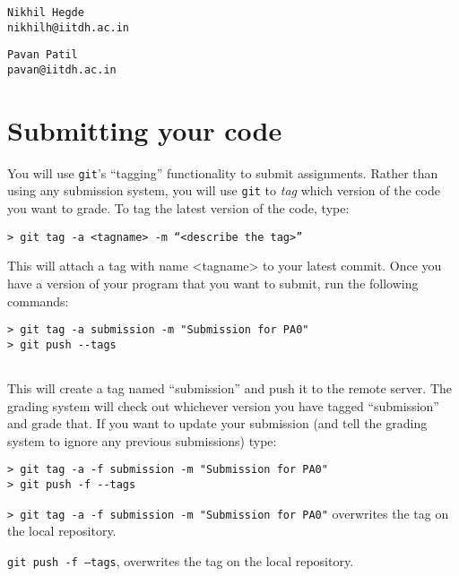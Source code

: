 \documentclass{article}
\begin{document}
\begin{lstlisting}[numbers=none]
Nikhil Hegde
nikhilh@iitdh.ac.in
\end{lstlisting}

\begin{lstlisting}[numbers=none]
Pavan Patil
pavan@iitdh.ac.in
\end{lstlisting}


\section{Submitting your code}
You will use \texttt{git}'s ``tagging'' functionality to submit assignments. Rather than using any submission system, you will use \texttt{git} to \emph{tag} which version of the code you want to grade. To tag the latest version of the code, type:

\texttt{> git tag -a <tagname> -m ``<describe the tag>''}

This will attach a tag with name <tagname> to your latest commit. Once you have a version of your program that you want to submit, run the following commands:
\begin{lstlisting}[numbers=none]
> git tag -a submission -m "Submission for PA0"
> git push --tags


\end{lstlisting}

This will create a tag named ``submission'' and push it to the remote server. The grading system will check out whichever version you have tagged ``submission'' and grade that. If you want to update your submission (and tell the grading system to ignore any previous submissions) type:

\begin{lstlisting}[numbers=none]
> git tag -a -f submission -m "Submission for PA0"
> git push -f --tags
\end{lstlisting}

\texttt{> git tag -a -f submission -m "Submission for PA0"} overwrites the tag on the local repository.

\texttt{git push -f --tags}, overwrites the tag on the local repository.
\end{document}
